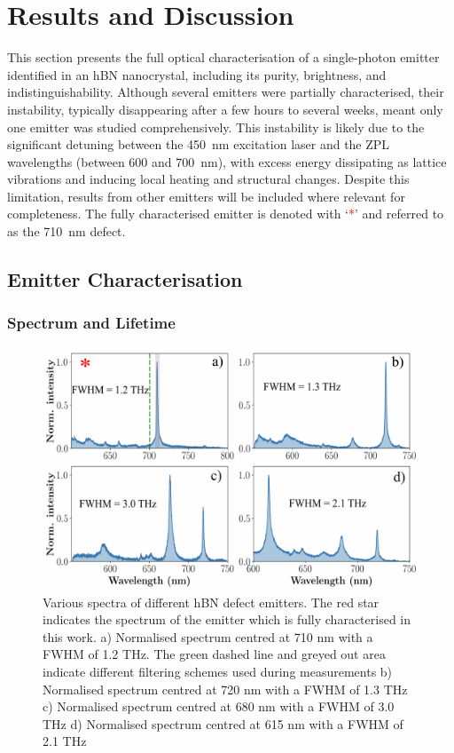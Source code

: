 \section{Results and Discussion}

This section presents the full optical characterisation of a single-photon emitter identified in an hBN nanocrystal, including its purity, brightness, and indistinguishability. Although several emitters were partially characterised, their instability, typically disappearing after a few hours to several weeks, meant only one emitter was studied comprehensively. This instability is likely due to the significant detuning between the 450~nm excitation laser and the ZPL wavelengths (between 600 and 700~nm), with excess energy dissipating as lattice vibrations and inducing local heating and structural changes. Despite this limitation, results from other emitters will be included where relevant for completeness. The fully characterised emitter is denoted with `\textcolor{red}{*}' and referred to as the 710~nm defect.


\subsection{Emitter Characterisation}

\subsubsection{Spectrum and Lifetime \label{spec-lt}}

\begin{figure}[h!]
    \centering
    \includegraphics[width=0.85\linewidth]{Figures/Spectrums.png}
    \caption{Various spectra of different hBN defect emitters. The red star indicates the spectrum of the emitter which is fully characterised in this work. a) Normalised spectrum centred at 710 nm with a FWHM of 1.2 THz. The green dashed line and greyed out area indicate different filtering schemes used during measurements b) Normalised spectrum centred at 720 nm with a FWHM of 1.3 THz c) Normalised spectrum centred at 680 nm with a FWHM of 3.0 THz d)
    Normalised spectrum centred at 615 nm with a FWHM of 2.1 THz}
    \label{fig:spectra}
\end{figure}


